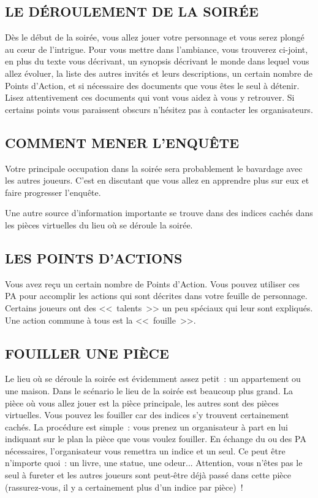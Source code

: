 \documentclass[14pt,twocolumn]{extarticle}
\begin{document}
\subsection{LE DÉROULEMENT DE LA SOIRÉE}

Dès le début de la soirée, vous allez jouer votre personnage et vous serez
plongé au c\oe{}ur de l'intrigue. Pour vous mettre dans l'ambiance, vous
trouverez ci-joint, en plus du texte vous décrivant, un synopsis décrivant le
monde dans lequel vous allez évoluer, la liste des autres invités et leurs
descriptions, un certain nombre de Points d'Action, et si nécessaire des
documents que vous êtes le seul à détenir. Lisez attentivement ces documents
qui vont vous aidez à vous y retrouver. Si certains points vous paraissent
obscurs n'hésitez pas à contacter les organisateurs.

\subsection{COMMENT MENER L'ENQUÊTE}

Votre principale occupation dans la soirée sera probablement le bavardage avec
les autres joueurs. C'est en discutant que vous allez en apprendre plus sur eux
et faire progresser l'enquête.

Une autre source d'information importante se trouve dans des indices cachés
dans les pièces virtuelles du lieu où se déroule la soirée.

\subsection{LES POINTS D'ACTIONS}

Vous avez reçu un certain nombre de Points d'Action. Vous pouvez utiliser ces
PA pour accomplir les actions qui sont décrites dans votre feuille de
personnage. Certains joueurs ont des <<~talents~>> un peu spéciaux qui leur
sont expliqués. Une action commune à tous est la <<~fouille~>>.

\subsection{FOUILLER UNE PIÈCE}

Le lieu où se déroule la soirée est évidemment assez petit~: un appartement ou
une maison. Dans le scénario le lieu de la soirée est beaucoup plus grand. La
pièce où vous allez jouer est la pièce principale, les autres sont des pièces
virtuelles. Vous pouvez les fouiller car des indices s'y trouvent certainement
cachés. La procédure est simple~: vous prenez un organisateur à part en lui
indiquant sur le plan la pièce que vous voulez fouiller. En échange du ou des
PA nécessaires, l'organisateur vous remettra un indice et un seul. Ce peut être
n'importe quoi~: un livre, une statue, une odeur... Attention, vous n'êtes pas
le seul à fureter et les autres joueurs sont peut-être déjà passé dans cette
pièce (rassurez-vous, il y a certainement plus d'un indice par pièce)~!
\end{document}
